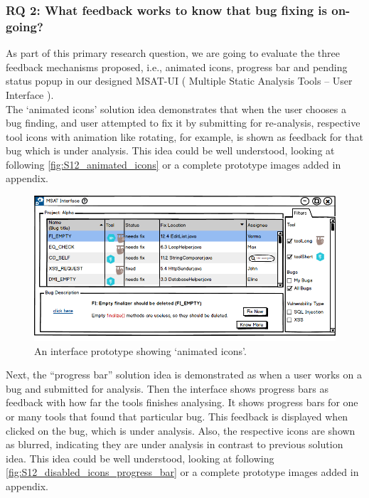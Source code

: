 \subsubsection{RQ 2: What feedback works to know that bug fixing is on-going?}

As part of this primary research question, we are going to evaluate the three feedback mechanisms proposed, i.e., animated icons, progress bar and pending status popup in our designed MSAT-UI ( Multiple Static Analysis Tools – User Interface ). \\

The ‘animated icons’ solution idea demonstrates that when the user chooses a bug finding, and user attempted to fix it by submitting for re-analysis,  respective tool icons with animation like rotating, for example, is shown as feedback for that bug which is under analysis. This idea could be well understood, looking at following \autoref{fig:S12_animated_icons} or a complete prototype images added in appendix. \\

\begin{figure}[hbt!]
	\centering
	\includegraphics[width=\linewidth]{figures/solution_ideas_snaps/S12_animated_icons}
	\caption{An interface prototype showing ‘animated icons’.}
	\label{fig:S12_animated_icons}
\end{figure}

Next, the “progress bar” solution idea is demonstrated as when a user works on a  bug and submitted for analysis.  Then the interface shows progress bars as feedback with how far the tools finishes analysing. It shows progress bars for one or many tools that found that particular bug. This feedback is displayed when clicked on the bug, which is under analysis. Also, the respective icons are shown as blurred, indicating they are under analysis in contrast to previous solution idea. This idea could be well understood, looking at following \autoref{fig:S12_disabled_icons_progress_bar} or a complete prototype images added in appendix. \\


